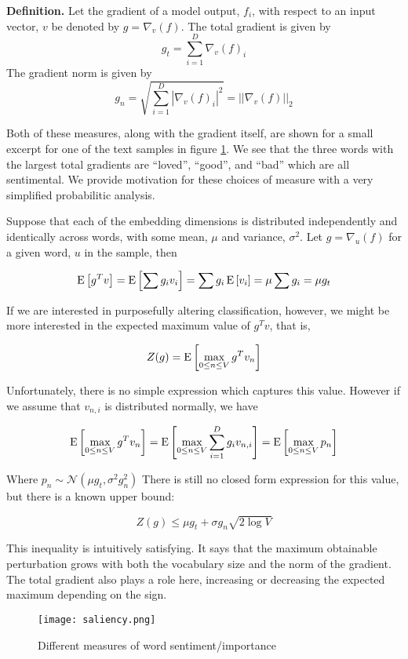 \noindent
\textbf{Definition.} Let the gradient of a model output, $f_i$, with respect to an input vector, $v$ be denoted by $g=\nabla_v(f)$.  The total gradient is given by 
$$g_t = \sum_{i=1}^D \nabla_v(f)_i$$
The gradient norm is given by 
$$g_n = \sqrt{\sum_{i=1}^D |\nabla_v(f)_i|^2} = ||\nabla_v(f)||_2$$

Both of these measures, along with the gradient itself, are shown for a small excerpt for one of the text samples in figure \ref{fig:saliency}.  We see that the three words with the largest total gradients are ``loved'', ``good'', and ``bad'' which are all sentimental.  We provide motivation for these choices of measure with a very simplified probabilitic analysis.

Suppose that each of the embedding dimensions is distributed independently and identically across words, with some mean, $\mu$ and variance, $\sigma^2$.  Let $g = \nabla_u(f)$ for a given word, $u$ in the sample, then 

$$\E{g^Tv} = \E{\sum{g_iv_i}} = \sum{g_i\E{v_i}} = \mu\sum{g_i} = \mu g_t$$

\noindent
If we are interested in purposefully altering classification, however, we might be more interested in the expected maximum value of $g^Tv$, that is,

$$Z(g) = \E{\underset{0\leq n\leq V}{\max}\,{g^Tv_n}}$$

\noindent
Unfortunately, there is no simple expression which captures this value.  However if we assume that $v_{n,i}$ is distributed normally, we have 

$$\E{\underset{0\leq n\leq V}{\max}\,{g^Tv_n}} = \E{\underset{0\leq n\leq V}{\max}\,{\sum_{i=1}^D{g_i}v_{n,i}}} = \E{\underset{0\leq n\leq V}{\max}\,{p_n}}$$

\noindent
Where $p_n \sim \mathcal{N}(\mu g_t,\sigma^2 g_n^2)$  There is still no closed form expression for this value, but there is a known upper bound:

$$Z(g) \leq \mu g_t + \sigma g_n\sqrt{2\log{V}}$$

\noindent
This inequality is intuitively satisfying.  It says that the maximum obtainable perturbation grows with both the vocabulary size and the norm of the gradient.  The total gradient also plays a role here, increasing or decreasing the expected maximum depending on the sign.

\begin{figure}
    \centering
    \texttt{[image: saliency.png]}
    \caption{Different measures of word sentiment/importance}
    \label{fig:saliency}
\end{figure}
